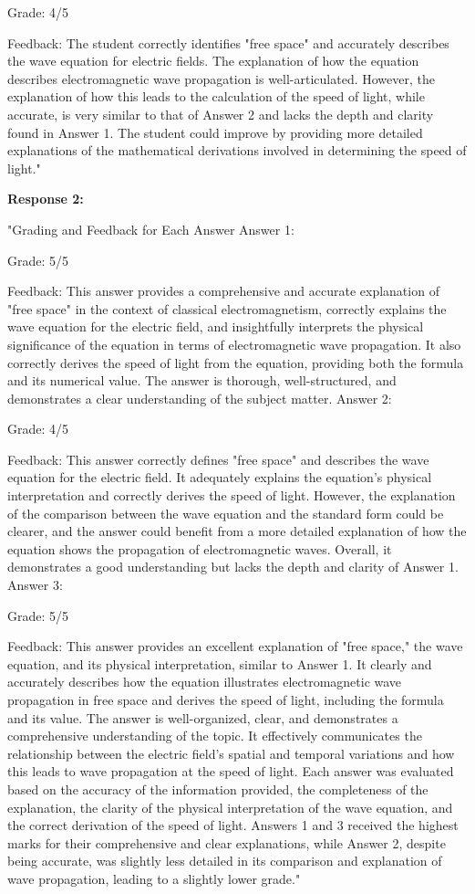 \documentclass[a4paper,11pt]{article}
\begin{document}
Grade: 4/5

Feedback: The student correctly identifies "free space" and accurately describes the wave equation for electric fields. The explanation of how the equation describes electromagnetic wave propagation is well-articulated. However, the explanation of how this leads to the calculation of the speed of light, while accurate, is very similar to that of Answer 2 and lacks the depth and clarity found in Answer 1. The student could improve by providing more detailed explanations of the mathematical derivations involved in determining the speed of light."

\textbf{Response 2:}

"Grading and Feedback for Each Answer
Answer 1:

Grade: 5/5

Feedback: This answer provides a comprehensive and accurate explanation of "free space" in the context of classical electromagnetism, correctly explains the wave equation for the electric field, and insightfully interprets the physical significance of the equation in terms of electromagnetic wave propagation. It also correctly derives the speed of light from the equation, providing both the formula and its numerical value. The answer is thorough, well-structured, and demonstrates a clear understanding of the subject matter.
Answer 2:

Grade: 4/5

Feedback: This answer correctly defines "free space" and describes the wave equation for the electric field. It adequately explains the equation's physical interpretation and correctly derives the speed of light. However, the explanation of the comparison between the wave equation and the standard form could be clearer, and the answer could benefit from a more detailed explanation of how the equation shows the propagation of electromagnetic waves. Overall, it demonstrates a good understanding but lacks the depth and clarity of Answer 1.
Answer 3:

Grade: 5/5

Feedback: This answer provides an excellent explanation of "free space," the wave equation, and its physical interpretation, similar to Answer 1. It clearly and accurately describes how the equation illustrates electromagnetic wave propagation in free space and derives the speed of light, including the formula and its value. The answer is well-organized, clear, and demonstrates a comprehensive understanding of the topic. It effectively communicates the relationship between the electric field's spatial and temporal variations and how this leads to wave propagation at the speed of light.
Each answer was evaluated based on the accuracy of the information provided, the completeness of the explanation, the clarity of the physical interpretation of the wave equation, and the correct derivation of the speed of light. Answers 1 and 3 received the highest marks for their comprehensive and clear explanations, while Answer 2, despite being accurate, was slightly less detailed in its comparison and explanation of wave propagation, leading to a slightly lower grade."
\end{document}
